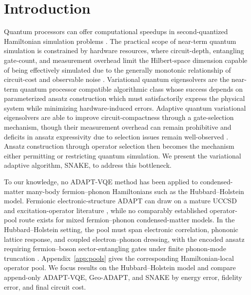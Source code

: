 \documentclass[
  reprint,
  amsmath,
  amssymb,
  aps,
  pra,
  nofootinbib,
  superscriptaddress,
  floatfix
]{revtex4-2}
\begin{document}
\section{Introduction}

Quantum processors can offer computational speedups in second-quantized Hamiltonian simulation problems \cite{Lloyd1996,AspuruGuzik2005}. The practical scope of near-term quantum simulation is constrained by hardware resources, where circuit-depth, entangling gate-count, and measurement overhead limit the Hilbert-space dimension capable of being effectively simulated due to the generally monotonic relationship of circuit-cost and observable noise \cite{Preskill2018NISQ,Cerezo2021VQA,Huggins2021Measurements}. Variational quantum eigensolvers are the near-term quantum processor compatible algorithmic class whose success depends on parameterized ansatz construction which must satisfactorily express the physical system while minimizing hardware-induced errors.  Adaptive quantum variational eigensolvers are able to improve circuit-compactness through a gate-selection mechanism, though their measurement overhead can remain prohibitive and deficits in ansatz expressivity due to selection issues remain well-observed \cite{Grimsley2019,Tang2021,Yordanov2021,Feniou2023ADAPT,Ikhtiarudin2025ShotEfficient}.  Ansatz construction through operator selection then becomes the mechanism either permitting or restricting quantum simulation. We present the variational adaptive algorithm, SNAKE, to address this bottleneck.


To our knowledge, no ADAPT-VQE method has been applied to condensed-matter many-body fermion--phonon Hamiltonians such as the Hubbard--Holstein model. Fermionic electronic-structure ADAPT can draw on a mature UCCSD and excitation-operator literature \cite{Romero2018UCC,Grimsley2019}, while no comparably established operator-pool route exists for mixed fermion--phonon condensed-matter models. In the Hubbard--Holstein setting, the pool must span electronic correlation, phononic lattice response, and coupled electron--phonon dressing, with the encoded ansatz requiring fermion--boson sector-entangling gates under finite phonon-mode truncation \cite{Hubbard1963,Holstein1959a,Holstein1959b}. Appendix~\ref{app:pools} gives the corresponding Hamiltonian-local operator pool. We focus results on the Hubbard--Holstein model and compare append-only ADAPT-VQE, Geo-ADAPT, and SNAKE by energy error, fidelity error, and final circuit cost.
\end{document}

